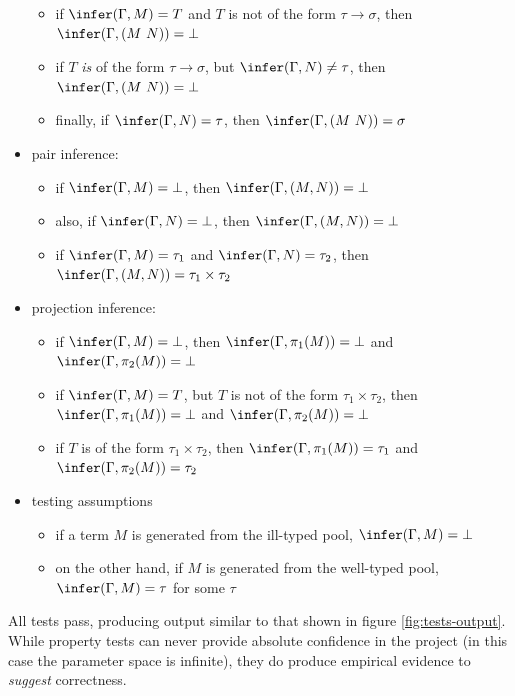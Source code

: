 \begin{itemize}
\begin{itemize}
\item if \(\infer(\Gamma, M) = T\) and \(T\) is not of the form \(\tau \to \sigma\), then \(\infer(\Gamma, (M\ N)) = \bot\)
\item if \(T\) \emph{is} of the form \(\tau \to \sigma\), but \(\infer(\Gamma, N) \neq \tau\), then \(\infer(\Gamma, (M\ N)) = \bot\)
\item finally, if \(\infer(\Gamma, N) = \tau\), then \(\infer(\Gamma, (M\ N)) = \sigma\)
\end{itemize}
\item pair inference:
\begin{itemize}
\item if \(\infer(\Gamma, M) = \bot\), then \(\infer(\Gamma, (M, N)) = \bot\)
\item also, if \(\infer(\Gamma, N) = \bot\), then \(\infer(\Gamma, (M, N)) = \bot\)
\item if \(\infer(\Gamma, M) = \tau_1\) and \(\infer(\Gamma, N) = \tau_2\), then \(\infer(\Gamma, (M, N)) = \tau_1 \times \tau_2\)
\end{itemize}
\item projection inference:
\begin{itemize}
\item if \(\infer(\Gamma, M) = \bot\), then \(\infer(\Gamma, \pi_1(M)) = \bot\) and \(\infer(\Gamma, \pi_2(M)) = \bot\)
\item if \(\infer(\Gamma, M) = T\), but \(T\) is not of the form \(\tau_1 \times \tau_2\), then \(\infer(\Gamma, \pi_1(M)) = \bot\) and \(\infer(\Gamma, \pi_2(M)) = \bot\)
\item if \(T\) is of the form \(\tau_1 \times \tau_2\), then \(\infer(\Gamma, \pi_1(M)) = \tau_1\) and \(\infer(\Gamma, \pi_2(M)) = \tau_2\)
\end{itemize}
\item testing assumptions
\begin{itemize}
\item if a term \(M\) is generated from the ill-typed pool, \(\infer(\Gamma, M) = \bot\)
\item on the other hand, if \(M\) is generated from the well-typed pool, \(\infer(\Gamma, M) = \tau\) for some \(\tau\)
\end{itemize}
\end{itemize}

All tests pass, producing output similar to that shown in figure \ref{fig:tests-output}.
While property tests can never provide absolute confidence in the project (in this case the parameter space is infinite), they do produce empirical evidence to \emph{suggest} correctness.

